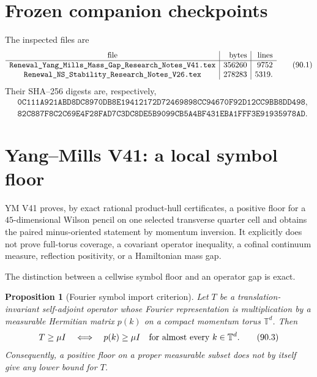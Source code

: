 \documentclass[11pt]{article}
\newtheorem{proposition}[theorem]{Proposition}
\theoremstyle{remark}
\begin{document}
\section{Frozen companion checkpoints}

The inspected files are
\[
\begin{array}{c|r|r}
\hbox{file}&\hbox{bytes}&\hbox{lines}\\ \hline
\texttt{Renewal\_Yang\_Mills\_Mass\_Gap\_Research\_Notes\_V41.tex}
 &356260&9752\\
\texttt{Renewal\_NS\_Stability\_Research\_Notes\_V26.tex}
 &278283&5319.
\end{array}                                             \tag{90.1}
\]
Their SHA--256 digests are, respectively,
\[
\begin{split}
 &\texttt{0C111A921ABD8DC8970DB8E19412172D72469898CC94670F92D12CC9BB8DD498},\\
 &\texttt{82C887F8C2C69E4F28FAD7C3DC8DE5B9099CB5A4BF431EBA1FFF3E91935978AD}.
\end{split}                                             \tag{90.2}
\]

\section{Yang--Mills V41: a local symbol floor}

YM V41 proves, by exact rational product-hull certificates, a
positive floor for a \(45\)-dimensional Wilson pencil on one
selected transverse quarter cell and obtains the paired
minus-oriented statement by momentum inversion.  It explicitly
does not prove full-torus coverage, a covariant operator
inequality, a cofinal continuum measure, reflection positivity, or
a Hamiltonian mass gap.

The distinction between a cellwise symbol floor and an operator
gap is exact.

\begin{proposition}[Fourier symbol import criterion]
\label{prop:v15v90-symbol}
Let \(T\) be a translation-invariant self-adjoint operator whose
Fourier representation is multiplication by a measurable Hermitian
matrix \(p(k)\) on a compact momentum torus \(\mathbb T^d\).  Then
\[
 T\geq\mu I
 \quad\Longleftrightarrow\quad
 p(k)\geq\mu I\quad\hbox{for almost every }k\in\mathbb T^d.          \tag{90.3}
\]
Consequently, a positive floor on a proper measurable subset does
not by itself give any lower bound for \(T\).
\end{proposition}
\end{document}
